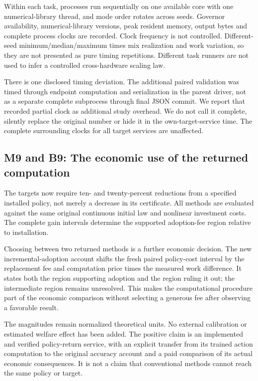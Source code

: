 Within each task, processes run sequentially on one available core with
one numerical-library thread, and mode order rotates across seeds.
Governor availability, numerical-library versions, peak resident memory,
output bytes and complete process clocks are recorded. Clock frequency
is not controlled. Different-seed minimum/median/maximum times mix
realization and work variation, so they are not presented as pure timing
repetitions. Different task runners are not used to infer a controlled
cross-hardware scaling law.

There is one disclosed timing deviation. The additional paired
validation was timed through endpoint computation and serialization in
the parent driver, not as a separate complete subprocess through final
JSON commit. We report that recorded partial clock as additional study
overhead. We do not call it complete, silently replace the original
number or hide it in the own-target-service time. The complete
surrounding clocks for all target services are unaffected.

\hypertarget{m9-and-b9-the-economic-use-of-the-returned-computation}{%
\subsection{M9 and B9: The economic use of the returned
computation}\label{m9-and-b9-the-economic-use-of-the-returned-computation}}

The targets now require ten- and twenty-percent reductions from a
specified installed policy, not merely a decrease in its certificate.
All methods are evaluated against the same original continuous initial
law and nonlinear investment costs. The complete gain intervals
determine the supported adoption-fee region relative to installation.

Choosing between two returned methods is a further economic decision.
The new incremental-adoption account shifts the fresh paired policy-cost
interval by the replacement fee and computation price times the measured
work difference. It states both the region supporting adoption and the
region ruling it out; the intermediate region remains unresolved. This
makes the computational procedure part of the economic comparison
without selecting a generous fee after observing a favorable result.

The magnitudes remain normalized theoretical units. No external
calibration or estimated welfare effect has been added. The positive
claim is an implemented and verified policy-return service, with an
explicit transfer from its trained action computation to the original
accuracy account and a paid comparison of its actual economic
consequences. It is not a claim that conventional methods cannot reach
the same policy or target.

